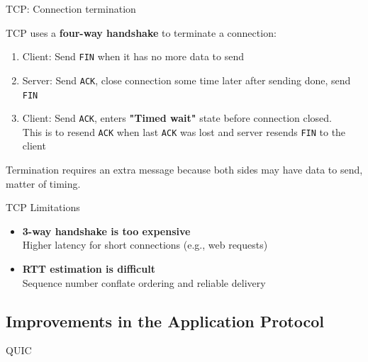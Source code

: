 \begin{theorem}
    {TCP: Connection termination}

    TCP uses a \textbf{four-way handshake} to terminate a connection:

    \begin{enumerate}
        \item Client: Send \texttt{FIN} when it has no more data to send
        \item Server: Send \texttt{ACK}, close connection some time later after sending done, send \texttt{FIN}
        \item Client: Send \texttt{ACK}, enters \textbf{"Timed wait"} state before connection closed. \\This is to resend \texttt{ACK} when last \texttt{ACK} was lost and server resends \texttt{FIN} to the client
    \end{enumerate}

    Termination requires an extra message because both sides may have data to send, matter of timing.
\end{theorem}


\begin{knBox}
    {TCP Limitations}

    \begin{itemize}
        \item \textbf{3-way handshake is too expensive}
              \\ Higher latency for short connections (e.g., web requests)
        \item \textbf{RTT estimation is difficult}
              \\ Sequence number conflate ordering and reliable delivery
    \end{itemize}
\end{knBox}

\subsection{Improvements in the Application Protocol}

\begin{definition}
    {QUIC }
\end{definition}

